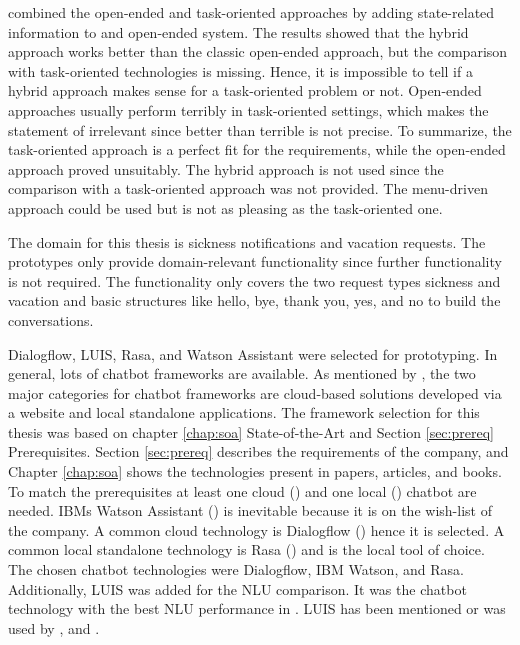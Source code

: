 \citet{williams2017hybrid} combined the open-ended and task-oriented approaches by adding state-related information to and open-ended system.
The results showed that the hybrid approach works better than the classic open-ended approach, but the comparison with task-oriented technologies is missing.
Hence, it is impossible to tell if a hybrid approach makes sense for a task-oriented problem or not.
Open-ended approaches usually perform terribly in task-oriented settings, which makes the statement of \citet{williams2017hybrid} irrelevant since better than terrible is not precise.
To summarize, the task-oriented approach is a perfect fit for the requirements, while the open-ended approach proved unsuitably.
The hybrid approach is not used since the comparison with a task-oriented approach was not provided.
The menu-driven approach could be used but is not as pleasing as the task-oriented one.

The domain for this thesis is sickness notifications and vacation requests.
The prototypes only provide domain-relevant functionality since further functionality is not required.
The functionality only covers the two request types sickness and vacation and basic structures like hello, bye, thank you, yes, and no to build the conversations.

Dialogflow, LUIS, Rasa, and Watson Assistant were selected for prototyping.
In general, lots of chatbot frameworks are available.
As mentioned by \citet{kane2016role}, the two major categories for chatbot frameworks are cloud-based solutions developed via a website and local standalone applications.
The framework selection for this thesis was based on chapter \ref{chap:soa} State-of-the-Art and Section \ref{sec:prereq} Prerequisites.
Section \ref{sec:prereq} describes the requirements of the company, and Chapter \ref{chap:soa} shows the technologies present in papers, articles, and books.
To match the prerequisites at least one cloud (\citet{braunEvaluatingNLU, rahman2017programming}) and one local (\citet{braunEvaluatingNLU}) chatbot are needed.
IBMs Watson Assistant (\citet{rahman2017programming, pharmacybot, ieee2018watson, gregori2017evaluation}) is inevitable because it is on the wish-list of the company.
A common cloud technology is Dialogflow (\citet{braunEvaluatingNLU, dutta2017developing, singhbuilding, buiildChatbotsPython, rahman2017programming, ieee2018watson}) hence it is selected.
A common local standalone technology is Rasa (\citet{braunEvaluatingNLU, singhbuilding, rasabocklisch2017, buiildChatbotsPython, gregori2017evaluation}) and is the local tool of choice.
The chosen chatbot technologies were Dialogflow, IBM Watson, and Rasa.
Additionally, LUIS\cite{luis2015williams} was added for the NLU comparison.
It was the chatbot technology with the best NLU performance in \citet{braunEvaluatingNLU}.
LUIS has been mentioned or was used by \citet{singhbuilding, buiildChatbotsPython, rahman2017programming, dutta2017developing}, 
and \citet{gregori2017evaluation}.

